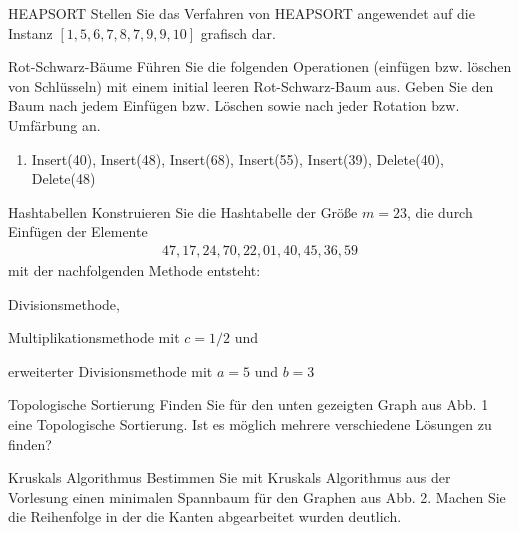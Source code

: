 \documentclass{exercisesheet}
\begin{document}
\begin{exercise}{HEAPSORT}
  Stellen Sie das Verfahren von HEAPSORT angewendet auf die Instanz $[1,5,6,7,8,7,9,9,10]$ grafisch dar.
\end{exercise}

\newpage\setcounter{section}{4}\setcounter{subsection}{0}
\begin{exercise}{Rot-Schwarz-Bäume}
  Führen Sie die folgenden Operationen (einfügen bzw. löschen von Schlüsseln) mit einem initial leeren Rot-Schwarz-Baum aus. Geben Sie den Baum nach jedem Einfügen bzw. Löschen sowie nach jeder Rotation bzw. Umfärbung an.
  \begin{enumerate}
    \item Insert(40), Insert(48), Insert(68), Insert(55), Insert(39), Delete(40), Delete(48)
  \end{enumerate}
\end{exercise}

\begin{eexercises}{Hashtabellen}{
    Konstruieren Sie die Hashtabelle der Größe $m = 23$, die durch Einfügen der Elemente
    \begin{align*}
      47, 17, 24, 70, 22, 01, 40, 45, 36, 59
    \end{align*}
    mit der nachfolgenden Methode entsteht:
  }
  \item Divisionsmethode,
  \item Multiplikationsmethode mit $c = 1/2$ und
  \item erweiterter Divisionsmethode mit $a = 5$ und $b = 3$
\end{eexercises}

\newpage\setcounter{section}{5}\setcounter{subsection}{0}
\begin{exercise}{Topologische Sortierung}
  Finden Sie für den unten gezeigten Graph aus Abb. 1 eine Topologische Sortierung. Ist es möglich mehrere verschiedene Lösungen zu finden?
  \begin{figure}[ht]
  \end{figure}
\end{exercise}

\begin{exercise}{Kruskals Algorithmus}
  Bestimmen Sie mit Kruskals Algorithmus aus der Vorlesung einen minimalen Spannbaum für den Graphen aus Abb. 2. Machen Sie die Reihenfolge in der die Kanten abgearbeitet wurden deutlich.
  \begin{figure}[ht]
  \end{figure}
\end{exercise}
\end{document}
